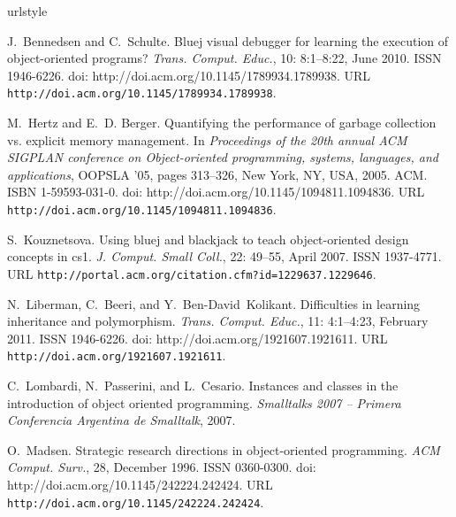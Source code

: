 \documentclass{sigplanconf}
\begin{document}
\begin{thebibliography}{}
\softraggedright

\providecommand{\natexlab}[1]{#1}
\providecommand{\url}[1]{\texttt{#1}}
\expandafter\ifx\csname urlstyle\endcsname\relax
  \providecommand{\doi}[1]{doi: #1}\else
  \providecommand{\doi}{doi: \begingroup \urlstyle{rm}\Url}\fi

J.~Bennedsen and C.~Schulte.
\newblock Bluej visual debugger for learning the execution of object-oriented
  programs?
\newblock \emph{Trans. Comput. Educ.}, 10: 8:1--8:22, June 2010.
\newblock ISSN 1946-6226.
\newblock \doi{http://doi.acm.org/10.1145/1789934.1789938}.
\newblock URL \url{http://doi.acm.org/10.1145/1789934.1789938}.

M.~Hertz and E.~D. Berger.
\newblock Quantifying the performance of garbage collection vs. explicit memory
  management.
\newblock In \emph{Proceedings of the 20th annual ACM SIGPLAN conference on
  Object-oriented programming, systems, languages, and applications}, OOPSLA
  '05, pages 313--326, New York, NY, USA, 2005. ACM.
\newblock ISBN 1-59593-031-0.
\newblock \doi{http://doi.acm.org/10.1145/1094811.1094836}.
\newblock URL \url{http://doi.acm.org/10.1145/1094811.1094836}.

S.~Kouznetsova.
\newblock Using bluej and blackjack to teach object-oriented design concepts in
  cs1.
\newblock \emph{J. Comput. Small Coll.}, 22: 49--55, April 2007.
\newblock ISSN 1937-4771.
\newblock URL \url{http://portal.acm.org/citation.cfm?id=1229637.1229646}.

N.~Liberman, C.~Beeri, and Y.~Ben-David~Kolikant.
\newblock Difficulties in learning inheritance and polymorphism.
\newblock \emph{Trans. Comput. Educ.}, 11: 4:1--4:23, February 2011.
\newblock ISSN 1946-6226.
\newblock \doi{http://doi.acm.org/1921607.1921611}.
\newblock URL \url{http://doi.acm.org/1921607.1921611}.

C.~Lombardi, N.~Passerini, and L.~Cesario.
\newblock Instances and classes in the introduction of object oriented
  programming.
\newblock \emph{Smalltalks 2007 -- Primera Conferencia Argentina de Smalltalk},
  2007.

O.~Madsen.
\newblock Strategic research directions in object-oriented programming.
\newblock \emph{ACM Comput. Surv.}, 28, December 1996.
\newblock ISSN 0360-0300.
\newblock \doi{http://doi.acm.org/10.1145/242224.242424}.
\newblock URL \url{http://doi.acm.org/10.1145/242224.242424}.


\end{thebibliography}
\end{document}
